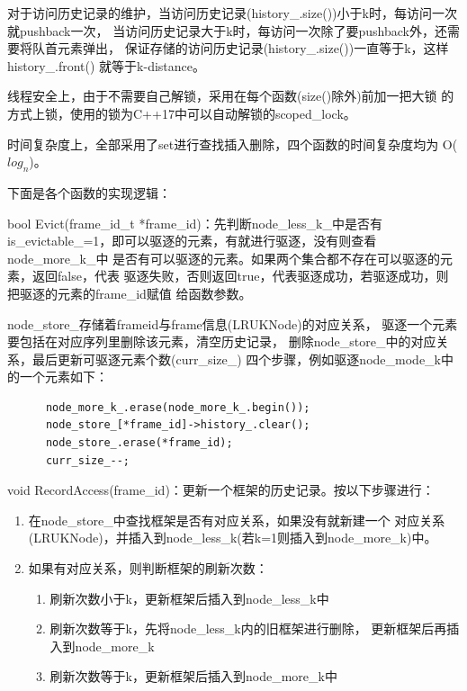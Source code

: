 \documentclass[a4paper]{article}
\begin{document}
对于访问历史记录的维护，当访问历史记录(history\_.size())小于k时，每访问一次就pushback一次，
当访问历史记录大于k时，每访问一次除了要pushback外，还需要将队首元素弹出，
保证存储的访问历史记录(history\_.size())一直等于k，这样history\_.front()
就等于k-distance。

线程安全上，由于不需要自己解锁，采用在每个函数(size()除外)前加一把大锁
的方式上锁，使用的锁为C++17中可以自动解锁的scoped\_lock。

时间复杂度上，全部采用了set进行查找插入删除，四个函数的时间复杂度均为
O($log_n$)。

下面是各个函数的实现逻辑：

bool Evict(frame\_id\_t *frame\_id)：先判断node\_less\_k\_中是否有
is\_evictable\_=1，即可以驱逐的元素，有就进行驱逐，没有则查看node\_more\_k\_中
是否有可以驱逐的元素。如果两个集合都不存在可以驱逐的元素，返回false，代表
驱逐失败，否则返回true，代表驱逐成功，若驱逐成功，则把驱逐的元素的frame\_id赋值
给函数参数。

node\_store\_存储着frameid与frame信息(LRUKNode)的对应关系，
驱逐一个元素要包括在对应序列里删除该元素，清空历史记录，
删除node\_store\_中的对应关系，最后更新可驱逐元素个数(curr\_size\_)
四个步骤，例如驱逐node\_mode\_k中的一个元素如下：

\begin{verbatim}
      node_more_k_.erase(node_more_k_.begin());
      node_store_[*frame_id]->history_.clear();
      node_store_.erase(*frame_id);
      curr_size_--;
\end{verbatim}

void RecordAccess(frame\_id)：更新一个框架的历史记录。按以下步骤进行：
\begin{enumerate}
   \item 在node\_store\_中查找框架是否有对应关系，如果没有就新建一个
   对应关系(LRUKNode)，并插入到node\_less\_k(若k=1则插入到node\_more\_k)中。
   \item 如果有对应关系，则判断框架的刷新次数：
   \begin{enumerate}
      \item 刷新次数小于k，更新框架后插入到node\_less\_k中
      \item 刷新次数等于k，先将node\_less\_k内的旧框架进行删除，
      更新框架后再插入到node\_more\_k
      \item 刷新次数等于k，更新框架后插入到node\_more\_k中
   \end{enumerate}
\end{enumerate}
\end{document}
